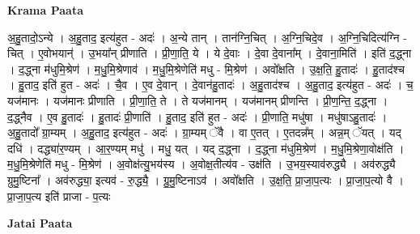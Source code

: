 \documentclass[17pt]{extarticle}
\begin{document}
\textbf{Krama Paata} \newline

अ॒हु॒तादो॒ऽन्ये । अ॒हु॒ताद॒ इत्य॑हुत - अदः॑ । अ॒न्ये तान् । तान॑ग्नि॒चित् । अ॒ग्नि॒चिदे॒व । अ॒ग्नि॒चिदित्य॑ग्नि - चित् । ए॒वोभयान्॑ । उ॒भया᳚न् प्रीणाति । प्री॒णा॒ति॒ ये । ये दे॒वाः । दे॒वा दे॒वाना᳚म् । दे॒वाना॒मिति॑ । इति॑ द॒द्ध्ना । द॒द्ध्ना म॑धुमि॒श्रेण॑ । म॒धु॒मि॒श्रेणाव॑ । म॒धु॒मि॒श्रेणेति॑ मधु - मि॒श्रेण॑ । अवो᳚क्षति । उ॒क्ष॒ति॒ हु॒तादः॑ । हु॒ताद॑श्च । हु॒ताद॒ इति॑ हुत - अदः॑ । चै॒व । ए॒व दे॒वान् । दे॒वान॑हु॒तादः॑ । अ॒हु॒ताद॑श्च । अ॒हु॒ताद॒ इत्य॑हुत - अदः॑ । च॒ यज॑मानः । यज॑मानः प्रीणाति । प्री॒णा॒ति॒ ते । ते यज॑मानम् । यज॑मानम् प्रीणन्ति । प्री॒ण॒न्ति॒ द॒द्ध्ना । द॒द्ध्नैव । ए॒व हु॒तादः॑ । हु॒तादः॑ प्री॒णाति॑ । हु॒ताद॒ इति॑ हुत - अदः॑ । प्री॒णाति॒ मधु॑षा । मधु॑षाऽहु॒तादः॑ । अ॒हु॒तादो᳚ ग्रा॒म्यम् । अ॒हु॒ताद॒ इत्य॑हुत - अदः॑ । ग्रा॒म्यम् ॅवै । वा ए॒तत् । ए॒तदन्न᳚म् । अन्न॒म् ॅयत् । यद् दधि॑ । दद्ध्या॑र॒ण्यम् । आ॒र॒ण्यम् मधु॑ । मधु॒ यत् । यद् द॒द्ध्ना । द॒द्ध्ना म॑धुमि॒श्रेण॑ । म॒धु॒मि॒श्रेणा॒वोक्ष॑ति । म॒धु॒मि॒श्रेणेति॑ मधु - मि॒श्रेण॑ । अ॒वोक्ष॑त्यु॒भय॑स्य । अ॒वोक्ष॒तीत्य॑व - उक्ष॑ति । उ॒भय॒स्याव॑रुद्ध्यै । अव॑रुद्ध्यै ग्रुमु॒ष्टिना᳚ । अव॑रुद्ध्या॒ इत्यव॑ - रु॒द्ध्यै॒ । ग्रु॒मु॒ष्टिनाऽव॑ । अवो᳚क्षति । उ॒क्ष॒ति॒ प्रा॒जा॒प॒त्यः । प्रा॒जा॒प॒त्यो वै । प्रा॒जा॒प॒त्य इति॑ प्राजा - प॒त्यः \newline

\textbf{Jatai Paata} \newline
\end{document}
